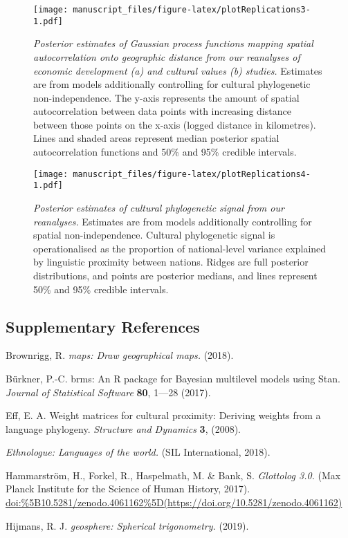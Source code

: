 \documentclass[english,man,floatsintext]{apa6}
\begin{document}
\newpage



\begin{figure}
\centering
\texttt{[image: manuscript\_files/figure-latex/plotReplications3-1.pdf]}
\caption{\label{fig:plotReplications3}\emph{Posterior estimates of Gaussian process functions mapping spatial autocorrelation onto geographic distance from our reanalyses of economic development (a) and cultural values (b) studies.} Estimates are from models additionally controlling for cultural phylogenetic non-independence. The y-axis represents the amount of spatial autocorrelation between data points with increasing distance between those points on the x-axis (logged distance in kilometres). Lines and shaded areas represent median posterior spatial autocorrelation functions and 50\% and 95\% credible intervals.}
\end{figure}

\newpage



\begin{figure}
\centering
\texttt{[image: manuscript\_files/figure-latex/plotReplications4-1.pdf]}
\caption{\label{fig:plotReplications4}\emph{Posterior estimates of cultural phylogenetic signal from our reanalyses.} Estimates are from models additionally controlling for spatial non-independence. Cultural phylogenetic signal is operationalised as the proportion of national-level variance explained by linguistic proximity between nations. Ridges are full posterior distributions, and points are posterior medians, and lines represent 50\% and 95\% credible intervals.}
\end{figure}

\newpage

\hypertarget{supplementary-references}{%
\subsection{Supplementary References}\label{supplementary-references}}

Brownrigg, R. \emph{maps: Draw geographical maps.} (2018).

Bürkner, P.-C. brms: An R package for Bayesian multilevel models using Stan. \emph{Journal of Statistical Software} \textbf{80}, 1---28 (2017).

Eff, E. A. Weight matrices for cultural proximity: Deriving weights from a language phylogeny. \emph{Structure and Dynamics} \textbf{3}, (2008).

\emph{Ethnologue: Languages of the world.} (SIL International, 2018).

Hammarström, H., Forkel, R., Haspelmath, M. \& Bank, S. \emph{Glottolog 3.0.} (Max Planck Institute for the Science of Human History, 2017). \url{doi:\%5B10.5281/zenodo.4061162\%5D(https://doi.org/10.5281/zenodo.4061162)}

Hijmans, R. J. \emph{geosphere: Spherical trigonometry.} (2019).
\end{document}
